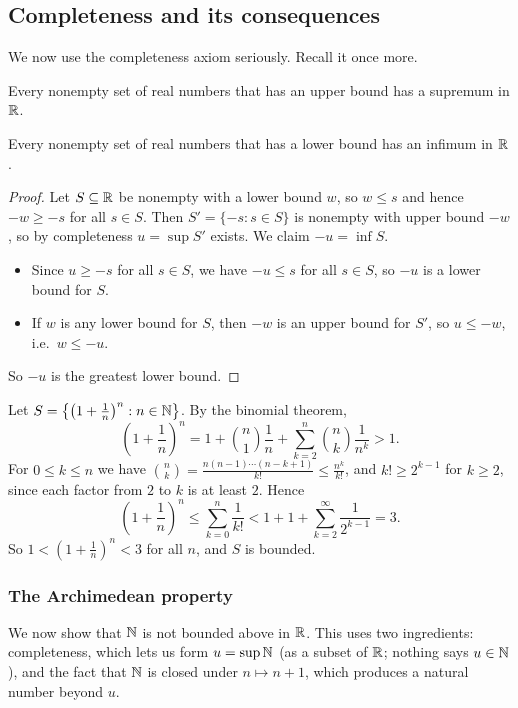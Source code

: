 \subsection{Completeness and its consequences}
We now use the completeness axiom seriously. Recall it once more.

\begin{axiom}
  Every nonempty set of real numbers that has an upper bound has a supremum
  in $\mathbb{R}$.
\end{axiom}

\begin{cor}
  Every nonempty set of real numbers that has a lower bound has an infimum
  in $\mathbb{R}$.
\end{cor}

\begin{proof}
  Let $S \subseteq \mathbb{R}$ be nonempty with a lower bound $w$, so $w \leq s$ and
  hence $-w \geq -s$ for all $s \in S$. Then $S' = \{-s : s \in S\}$ is
  nonempty with upper bound $-w$, so by completeness $u = \sup S'$ exists.
  We claim $-u = \inf S$.
  \begin{itemize}
    \item Since $u \geq -s$ for all $s \in S$, we have $-u \leq s$ for all
      $s \in S$, so $-u$ is a lower bound for $S$.
    \item If $w$ is any lower bound for $S$, then $-w$ is an upper bound for
      $S'$, so $u \leq -w$, i.e.\ $w \leq -u$.
  \end{itemize}
  So $-u$ is the greatest lower bound.
\end{proof}

\begin{eg}
  Let $S = \left\{\left(1 + \frac{1}{n}\right)^n : n \in \mathbb{N}\right\}$. By the
  binomial theorem,
  \[
    \left(1 + \frac{1}{n}\right)^n = 1 + \binom{n}{1}\frac{1}{n} + \sum_{k=2}^{n} \binom{n}{k}\frac{1}{n^k} > 1.
  \]
  For $0 \leq k \leq n$ we have
  $\binom{n}{k} = \frac{n(n - 1)\cdots(n - k + 1)}{k!} \leq \frac{n^k}{k!}$,
  and $k! \geq 2^{k - 1}$ for $k \geq 2$, since each factor from $2$ to $k$
  is at least $2$. Hence
  \[
    \left(1 + \frac{1}{n}\right)^n \leq \sum_{k=0}^{n} \frac{1}{k!} < 1 + 1 + \sum_{k=2}^{\infty} \frac{1}{2^{k - 1}} = 3.
  \]
  So $1 < \left(1 + \frac{1}{n}\right)^n < 3$ for all $n$, and $S$ is bounded.
\end{eg}

\subsubsection*{The Archimedean property}
We now show that $\mathbb{N}$ is not bounded above in $\mathbb{R}$. This uses two
ingredients: completeness, which lets us form $u = \sup \mathbb{N}$ (as a subset of
$\mathbb{R}$; nothing says $u \in \mathbb{N}$), and the fact that $\mathbb{N}$ is closed under
$n \mapsto n + 1$, which produces a natural number beyond $u$.

